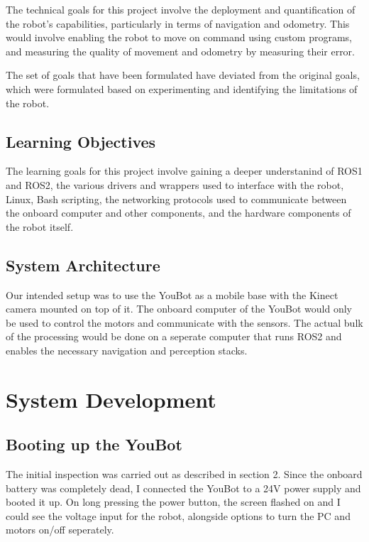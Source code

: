 \documentclass[a4paper, 12pt]{article}
\newif\ifshownotes
\newcommand{\notes}[1]{\ifshownotes\textcolor{blue}{#1}\fi}
\begin{document}
    The technical goals for this project involve the deployment and quantification of the robot's capabilities, particularly in terms of navigation and odometry. This would involve enabling the robot to move on command using custom programs, and measuring the quality of movement and odometry by measuring their error. 

    
    The set of goals that have been formulated have deviated from the original goals, which were formulated based on experimenting and identifying the limitations of the robot. 

    \subsection{Learning Objectives}
    The learning goals for this project involve gaining a deeper understanind of ROS1 and ROS2, the various drivers and wrappers used to interface with the robot, Linux, Bash scripting, the networking protocols used to communicate between the onboard computer and other components, and the hardware components of the robot itself. 

    \subsection{System Architecture}
    Our intended setup was to use the YouBot as a mobile base with the Kinect camera mounted on top of it. The onboard computer of the YouBot would only be used to control the motors and communicate with the sensors. The actual bulk of the processing would be done on a seperate computer that runs ROS2 and enables the necessary navigation and perception stacks.  

    \pagebreak

    \section{System Development}
    \subsection{Booting up the YouBot}

    \notes{describe the booting up process here, what ports to use, how to connect to the onboard computer, etc.}

    \notes{furthermore describe issues with software that needed to be fixed, such as the bashrc file, the networking, etc.}

    The initial inspection was carried out as described in section 2. Since the onboard battery was completely dead, I connected the YouBot to a 24V power supply and booted it up. On long pressing the power button, the screen flashed on and I could see the voltage input for the robot, alongside options to turn the PC and motors on/off seperately. 
\end{document}

